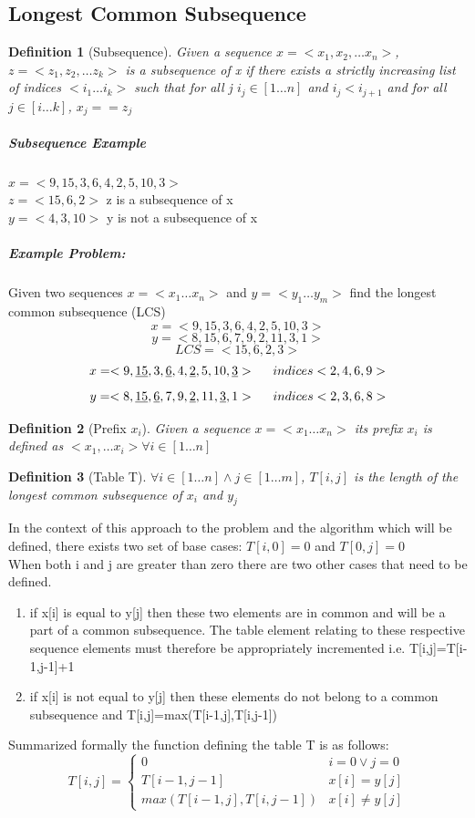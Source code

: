 \documentclass[12pt,letterpaper]{article}
\newtheorem{definition}{Definition}[section]
\begin{document}
\subsection{Longest Common Subsequence}
\begin{definition}[Subsequence] \hfill \break
Given a sequence $x=<x_1, x_2, \dots x_n>$, $z=<z_1, z_2, \dots z_k>$ is a subsequence of x if there exists a strictly increasing list of indices $ <i_1 \dots i_k> $ such that for all j $i_j \in [1\dots n]$ and $i_j<i_{j+1}$ and for all $j\in [i\dots k]$, $ x_j==z_j$
\end{definition}
\subparagraph{Subsequence Example}
$x=<9,15,3,6,4,2,5,10,3>$\\
$z=<15,6,2>$ z is a subsequence of x\\
$y=<4, 3, 10>$ y is not a subsequence of x\\
\subparagraph{Example Problem:} Given two sequences $x=<x_1\dots x_n>$ and $y=<y_1\dots y_m>$ find the longest common subsequence (LCS)\\
\[x=<9,15,3,6,4,2,5,10,3>\]
\[y=<8,15,6,7,9,2,11,3,1>\]
\[LCS=<15,6,2,3>\]
\[x=<9,\underline{15},3,\underline{6},4,\underline{2},5,10,\underline{3}> \hspace{5mm} indices<2,4,6,9>\]
\[y=<8,\underline{15},\underline{6},7,9,\underline{2},11,\underline{3},1>\hspace{5mm} indices<2,3,6,8>\]
\begin{definition}[Prefix $x_i$]
Given a sequence $x=<x_1\dots x_n>$ its prefix $x_i$ is defined as $<x_1,\dots x_i> \forall i \in [1\dots n]$
\end{definition}
\begin{definition}[Table T]
$\forall i \in [1\dots n]\wedge j \in [1\dots m]$, $T[i,j]$ is the length of the longest common subsequence of $x_i$ and $y_j$
\end{definition}
In the context of this approach to the problem and the algorithm which will be defined, there exists two set of base cases: $T[i,0]=0$ and $T[0,j]=0$\\
When both i and j are greater than zero there are two other cases that need to be defined.
\begin{enumerate}
\item if x[i] is equal to y[j] then these two elements are in common and will be a part of a common subsequence. The table element relating to these respective sequence elements must therefore be appropriately incremented i.e. T[i,j]=T[i-1,j-1]+1
\item if x[i] is not equal to y[j] then these elements do not belong to a common subsequence and T[i,j]=max(T[i-1,j],T[i,j-1])
\end{enumerate} 
Summarized formally the function defining the table T is as follows:
\[T[i,j]=\begin{cases} 0 & i=0\vee j=0 \\ T[i-1,j-1] & x[i]=y[j]\\ max(T[i-1,j],T[i,j-1]) & x[i]\neq y[j]\end{cases}\]
\end{document}
